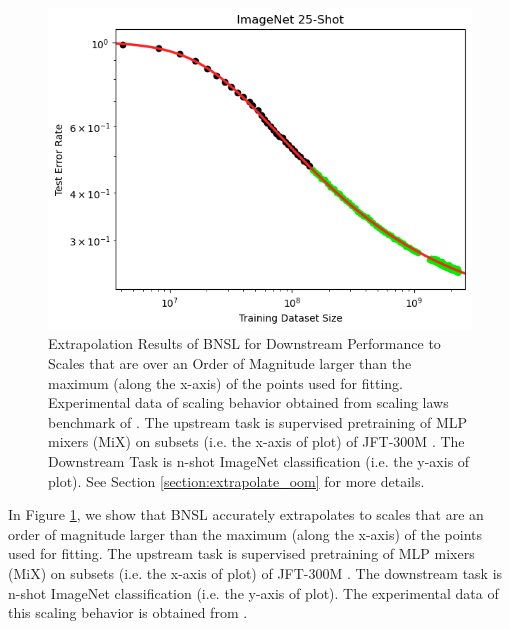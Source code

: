 \documentclass{article} %
\begin{document}
\begin{figure}[htbp]
    \centering
\includegraphics[width=1.0\textwidth]{figures/order_of_magnitude__data_x-axis/imagenet_25___MiX_L_16.png}

    \caption{
    Extrapolation Results of BNSL for Downstream Performance to Scales that are over an Order of Magnitude larger than the maximum (along the x-axis) of the points used for fitting. Experimental data of scaling behavior obtained from scaling laws benchmark of \cite{Alabdulmohsi2022revisiting}. The upstream task is supervised pretraining of MLP mixers (MiX) \citep{tolstikhin2021mlp} on subsets (i.e. the x-axis of plot) of JFT-300M \citep{sun2017revisiting}. The Downstream Task is n-shot ImageNet classification (i.e. the y-axis of plot). See Section \ref{section:extrapolate_oom} for more details.
    }
    \label{fig:extrapolate_oom}
\end{figure}

In Figure \ref{fig:extrapolate_oom}, we show that BNSL accurately extrapolates to scales that are an order of magnitude larger than the maximum (along the x-axis) of the points used for fitting. The upstream task is supervised pretraining of MLP mixers (MiX) \citep{tolstikhin2021mlp} on subsets (i.e. the x-axis of plot) of JFT-300M \citep{sun2017revisiting}. The downstream task is n-shot ImageNet classification (i.e. the y-axis of plot). The experimental data of this scaling behavior is obtained from \cite{Alabdulmohsi2022revisiting}.
\end{document}
